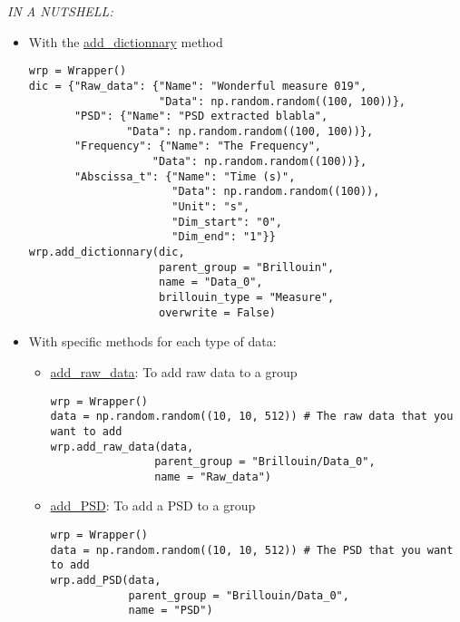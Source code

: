 \begin{tcolorbox}
\textit{IN A NUTSHELL:}
\begin{itemize}
    \item With the \hyperref[subsec:wrapper.add_dictionnary]{add\_dictionnary} method 
\begin{lstlisting}
wrp = Wrapper()
dic = {"Raw_data": {"Name": "Wonderful measure 019", 
                    "Data": np.random.random((100, 100))},
       "PSD": {"Name": "PSD extracted blabla", 
               "Data": np.random.random((100, 100))},
       "Frequency": {"Name": "The Frequency",   
                   "Data": np.random.random((100))},
       "Abscissa_t": {"Name": "Time (s)", 
                      "Data": np.random.random((100)),
                      "Unit": "s",
                      "Dim_start": "0",
                      "Dim_end": "1"}}
wrp.add_dictionnary(dic, 
                    parent_group = "Brillouin", 
                    name = "Data_0", 
                    brillouin_type = "Measure",
                    overwrite = False)
\end{lstlisting}
    \item With specific methods for each type of data:
    \begin{itemize}
        \item \hyperref[subsec:wrapper.add_raw_data]{add\_raw\_data}: To add raw data to a group
\begin{lstlisting}
wrp = Wrapper()
data = np.random.random((10, 10, 512)) # The raw data that you want to add
wrp.add_raw_data(data,
                parent_group = "Brillouin/Data_0", 
                name = "Raw_data")
\end{lstlisting}
        \item \hyperref[subsec:wrapper.add_psd]{add\_PSD}: To add a PSD to a group
\begin{lstlisting}
wrp = Wrapper()
data = np.random.random((10, 10, 512)) # The PSD that you want to add
wrp.add_PSD(data,
            parent_group = "Brillouin/Data_0", 
            name = "PSD")
\end{lstlisting}
        
\end{itemize}
\end{itemize}
\end{tcolorbox}
